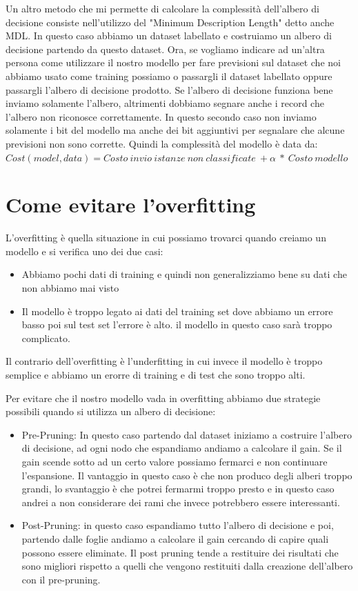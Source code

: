 \documentclass[14pt]{extreport}
\begin{document}
Un altro metodo che mi permette di calcolare la complessità dell'albero di decisione consiste nell'utilizzo del "Minimum Description Length" detto anche MDL.
In questo caso abbiamo un dataset labellato e costruiamo un albero di decisione partendo da questo dataset. Ora, se vogliamo indicare ad un'altra persona come utilizzare il nostro modello per fare previsioni sul dataset che noi abbiamo usato come training possiamo o passargli il dataset labellato oppure passargli l'albero di decisione prodotto.
Se l'albero di decisione funziona bene inviamo solamente l'albero, altrimenti dobbiamo segnare anche i record che l'albero non riconosce correttamente.
In questo secondo caso non inviamo solamente i bit del modello ma anche dei bit aggiuntivi per segnalare che alcune previsioni non sono corrette.
Quindi la complessità del modello è data da:
\newline
$Cost(model,data) = Costo\ invio\ istanze\ non\ classificate\ + \alpha \ *\ Costo\ modello$

\section{Come evitare l'overfitting}

L'overfitting è quella situazione in cui possiamo trovarci quando creiamo un modello e si verifica uno dei due casi:
\begin{itemize}
\item Abbiamo pochi dati di training e quindi non generalizziamo bene su dati che non abbiamo mai visto
\item Il modello è troppo legato ai dati del training set dove abbiamo un errore basso poi sul test set l'errore è alto. il modello in questo caso sarà troppo complicato.
\end{itemize}

Il contrario dell'overfitting è l'underfitting in cui invece il modello è troppo semplice e abbiamo un erorre di training e di test che sono troppo alti.

Per evitare che il nostro modello vada in overfitting abbiamo due strategie possibili quando si utilizza un albero di decisione:

\begin{itemize}
    \item Pre-Pruning: In questo caso partendo dal dataset iniziamo a costruire l'albero di decisione, ad ogni nodo che espandiamo andiamo a calcolare il gain. Se il gain scende sotto ad un certo valore possiamo fermarci e non continuare l'espansione.
    Il vantaggio in questo caso è che non produco degli alberi troppo grandi, lo svantaggio è che potrei fermarmi troppo presto e in questo caso andrei a non considerare dei rami che invece potrebbero essere interessanti.
    \item Post-Pruning: in questo caso espandiamo tutto l'albero di decisione e poi, partendo dalle foglie andiamo a calcolare il gain cercando di capire quali possono essere eliminate.
    Il post pruning tende a restituire dei risultati che sono migliori rispetto a quelli che vengono restituiti dalla creazione dell'albero con il pre-pruning.
\end{itemize}
\end{document}
